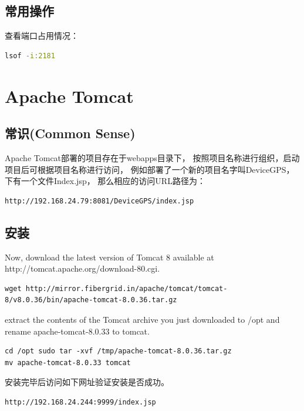 \documentclass{book}
\begin{document}
\subsection{常用操作}

查看端口占用情况：

\begin{lstlisting}[language=Bash]
lsof -i:2181
\end{lstlisting}



\section{Apache Tomcat}

\subsection{常识(Common Sense)}

Apache Tomcat部署的项目存在于webapps目录下，
按照项目名称进行组织，启动项目后可根据项目名称进行访问，
例如部署了一个新的项目名字叫DeviceGPS，下有一个文件Index.jsp，
那么相应的访问URL路径为：

\begin{lstlisting}[language=HTML]
http://192.168.24.79:8081/DeviceGPS/index.jsp
\end{lstlisting}

\subsection{安装}

Now, download the latest version of Tomcat 8 available at http://tomcat.apache.org/download-80.cgi.

\begin{lstlisting}
wget http://mirror.fibergrid.in/apache/tomcat/tomcat-8/v8.0.36/bin/apache-tomcat-8.0.36.tar.gz
\end{lstlisting}

extract the contents of the Tomcat archive you just downloaded to /opt and rename apache-tomcat-8.0.33 to tomcat.

\begin{lstlisting}
cd /opt sudo tar -xvf /tmp/apache-tomcat-8.0.36.tar.gz 
mv apache-tomcat-8.0.33 tomcat
\end{lstlisting}

安装完毕后访问如下网址验证安装是否成功。

\begin{lstlisting}[language=HTML]
http://192.168.24.244:9999/index.jsp
\end{lstlisting}
\end{document}
